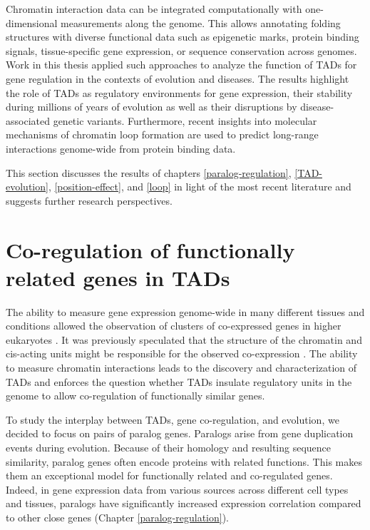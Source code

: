 \documentclass[a4paper,twoside=true,openright,parskip=full,chapterprefix=true,11pt,headings=normal,bibliography=totoc,listof=totoc,titlepage=on,captions=tableabove,draft=false]{scrreprt}
\theoremstyle{definition}
\theoremstyle{definition}
\theoremstyle{definition}
\theoremstyle{remark}
\begin{document}
Chromatin interaction data can be integrated computationally with
one-dimensional measurements along the genome. This allows annotating
folding structures with diverse functional data such as epigenetic
marks, protein binding signals, tissue-specific gene expression, or
sequence conservation across genomes. Work in this thesis applied such
approaches to analyze the function of TADs for gene regulation in the
contexts of evolution and diseases. The results highlight the role of
TADs as regulatory environments for gene expression, their stability
during millions of years of evolution as well as their disruptions by
disease-associated genetic variants. Furthermore, recent insights into
molecular mechanisms of chromatin loop formation are used to predict
long-range interactions genome-wide from protein binding data.

This section discusses the results of chapters \ref{paralog-regulation},
\ref{TAD-evolution}, \ref{position-effect}, and \ref{loop} in light of
the most recent literature and suggests further research perspectives.

\hypertarget{co-regulation-of-functionally-related-genes-in-tads}{%
\section{Co-regulation of functionally related genes in
TADs}\label{co-regulation-of-functionally-related-genes-in-tads}}

The ability to measure gene expression genome-wide in many different
tissues and conditions allowed the observation of clusters of
co-expressed genes in higher eukaryotes
\citep{Boutanaev2002, Purmann2007}. It was previously speculated that
the structure of the chromatin and cis-acting units might be responsible
for the observed co-expression \citep{Sproul2005, Purmann2007}. The
ability to measure chromatin interactions leads to the discovery and
characterization of TADs and enforces the question whether TADs insulate
regulatory units in the genome to allow co-regulation of functionally
similar genes.

To study the interplay between TADs, gene co-regulation, and evolution,
we decided to focus on pairs of paralog genes. Paralogs arise from gene
duplication events during evolution. Because of their homology and
resulting sequence similarity, paralog genes often encode proteins with
related functions. This makes them an exceptional model for functionally
related and co-regulated genes. Indeed, in gene expression data from
various sources across different cell types and tissues, paralogs have
significantly increased expression correlation compared to other close
genes (Chapter \ref{paralog-regulation}).
\end{document}
